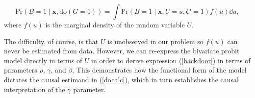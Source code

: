 \documentclass[aoas,preprint, 11pt, dvipsnames, table, x11name]{imsart}
\theoremstyle{remark}
\begin{document}
\begin{equation}\label{backdoor}
\mbox{Pr}(B = 1 \mid \mathbf{x}, \text{do}(G = 1)) =  \int  \mbox{Pr}(B = 1 \mid \mathbf{x}, U=u, G = 1) f(u) \dd u,
\end{equation}
where $f(u)$ is the marginal density of the random variable $U$.

The difficulty, of course, is that $U$ is unobserved in our problem so $f(u)$ can never be estimated from data.  However, we can re-express the bivariate probit model directly in terms of $U$ in order to derive expression (\ref{backdoor}) in terms of parameters $\rho$, $\gamma$, and $\beta$.  This demonstrates how the functional form of the model dictates the causal estimand in (\ref{docalc}), which in turn establishes the causal interpretation of the $\gamma$ parameter.  
\end{document}
